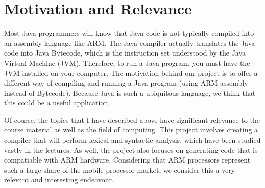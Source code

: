 \documentclass[11pt]{article}
\begin{document}
\section{Motivation and Relevance}

Most Java programmers will know that Java code is not typically compiled into an assembly language like ARM. The Java compiler actually translates the Java code into Java Bytecode, which is the instruction set understood by the Java Virtual Machine (JVM). Therefore, to run a Java program, you must have the JVM installed on your computer. The motivation behind our project is to offer a different way of compiling and running a Java program (using ARM assembly instead of Bytecode). Because Java is such a ubiquitous language, we think that this could be a useful application. 

Of course, the topics that I have described above have significant relevance to the course material as well as the field of computing. This project involves creating a compiler that will perform lexical and syntactic analysis, which have been studied vastly in the lectures. As well, the project also focuses on generating code that is compatiable with ARM hardware. Considering that ARM processors represent such a large share of the mobile processor market, we consider this a very relevant and interesting endeavour. 
\end{document}
